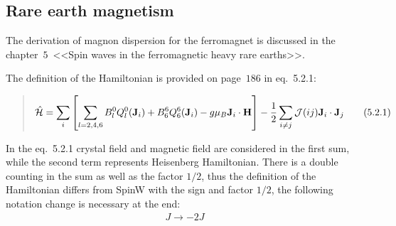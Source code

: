 \subsection{Rare earth magnetism \cite{jensen1991rare}}\label{subsec:rem}
    The derivation of magnon dispersion for the ferromagnet is discussed in the chapter~$5$~<<Spin waves in the ferromagnetic heavy rare earths>>.

    The definition of the Hamiltonian is provided on page~$186$ in eq.~5.2.1:

    \begin{quote}
        \begin{equation}
            \hat{\mathcal{H}} = \sum_i\left[\sum_{l = 2,4,6}B^0_lQ_l^0(\mathbf{J}_i) + B^6_6Q_6^6(\mathbf{J}_i) - g\mu_B \mathbf{J}_i\cdot\mathbf{H}\right]
            - \dfrac{1}{2} \sum_{i\ne j} \mathcal{J}(ij)\mathbf{J} _i\cdot\mathbf{J}_j\label{eq:rem-5.2.1} \tag{5.2.1}
        \end{equation}
    \end{quote}
    
    In the eq.~5.2.1 crystal field and magnetic field are considered in the first sum, while the second term represents Heisenberg Hamiltonian.
    There is a double counting in the sum as well as the factor $1/2$, thus the definition of the Hamiltonian differs from SpinW with the sign and factor $1/2$, the following notation change is necessary at the end:
    \begin{equation}
        \begin{matrix} 
            J \rightarrow -2J
        \end{matrix}
    \end{equation}

